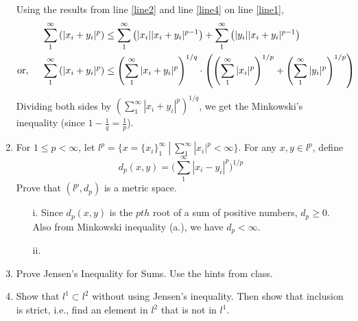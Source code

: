 \documentclass[12pt]{article}
\newcommand{\ds}{\displaystyle}
\begin{document}
\begin{enumerate}
\begin{mybox}
    Using the results from line \ref{line2} and line \ref{line4} on line
    \ref{line1},
    \begin{align}
      \sum_{1}^{\infty}{\left(|x_{i} + y_{i}|^p\right)}
      &\leq \sum_{1}^{\infty}{\left(|x_i||x_{i} + y_{i}|^{p-1}\right)}
      +\sum_{1}^{\infty}{\left(|y_i||x_{i} + y_{i}|^{p-1}\right)}\\
      \text{or,}\hspace*{5mm}
      \sum_{1}^{\infty}{\left(|x_{i} + y_{i}|^p\right)}
      &\leq\left(\sum_{1}^{\infty}{|x_i+y_i|^{p}}\right)^{1/q}
      \cdot\left(\left(\sum_{1}^{\infty}{|x_i|^p}\right)^{1/p}
      +\left(\sum_{1}^{\infty}{|y_i|^p}\right)^{1/p}\right)
    \end{align}
    Dividing both sides by
    $\left(\sum_{1}^{\infty}{|x_i+y_i|^{p}}\right)^{1/q}$,
    we get the Minkowski's inequality (since $1-\frac{1}{q}=\frac{1}{p}$).

  \end{mybox}
  \item For $1 \leq p < \infty$, let $\ds l^p = \{x = \{x_i\}_1^{\infty} \ | \ \sum_1^{\infty}|x_i|^p < \infty \}$. For any $x, y \in l^p$, define 
  $$d_p(x,y) = \Big( \sum_1^{\infty}|x_i - y_i|^p \Big)^{1/p}$$
  Prove that $(l^p, d_p)$ is a metric space.

  \begin{mybox}
    
      \begin{enumerate}
        \item[i.]
              Since $d_p(x,y)$ is the $pth$ root of a sum of positive
              numbers, $d_p\geq 0$. Also from Minkowski inequality (a.),
              we have $d_p<\infty$.
              
        \item[ii.]
              
        \item[] 
              
    \end{enumerate}
  \end{mybox}
  
  \item Prove Jensen's Inequality for Sums. Use the hints from class. 
  
   \item Show that $l^1 \subset l^2$ without using Jensen's inequality. Then show that inclusion is strict, i.e., find an element in $l^2$ that is not in $l^1$. 
  

 
  \end{enumerate}
\end{document}
